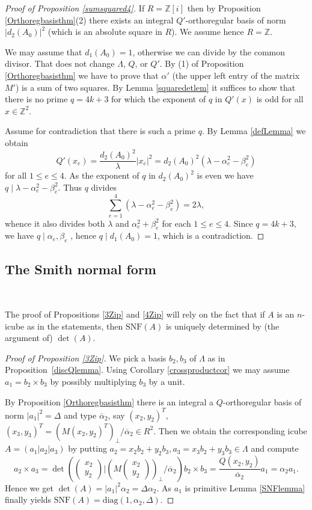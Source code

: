 \documentclass[11pt]{amsart}
\newcommand{\diag}{\mathrm{diag}}
\newcommand{\SNF}{\mathrm{SNF}}
\newcommand{\ZZ}{\mathbb{Z}}
\theoremstyle{definition}
\theoremstyle{remark}
\begin{document}
\begin{proof}[Proof of Proposition \ref{sumsquared4}]
If $R=\mathbb Z[i]$ then by Proposition \ref{Orthoregbasisthm}(2) there exists an integral $Q'$-orthoregular basis of norm $|d_2(A_0)|^2$ (which is an absolute square in $R$). We assume hence $R=\ZZ$.

We may assume that $d_1(A_0)=1$, otherwise we can divide by the common divisor. That does not change $\Lambda$, $Q$, or 
$Q'$. By (1) of Proposition \ref{Orthoregbasisthm} we have to prove that $\alpha'$ (the upper left entry of the matrix $M'$) is a sum of two squares. By Lemma \ref{squaredetlem} it suffices to show that there is no prime $q=4k+3$ for which the exponent of $q$ in $Q'(x)$ is odd for all $x\in\mathbb Z^2$.

Assume for contradiction that there is such a prime $q$. By Lemma \ref{defLemma} we obtain
\[Q'(x_e)=\frac{d_2(A_0)^2}{\lambda}|x_e|^2=d_2(A_0)^2(\lambda-\alpha_e^2-\beta_e^2)\]
for all $1\leq e\leq 4$. As the exponent of $q$ in $d_2(A_0)^2$ is even we have $q\mid\lambda-\alpha_e^2-\beta_e^2$. Thus $q$ divides
\[\sum_{e=1}^4\left(\lambda-\alpha_e^2-\beta_e^2\right)=2\lambda,\]
whence it also divides both $\lambda$ and $\alpha_e^2+\beta_e^2$ for each $1\leq e\leq 4$. Since $q=4k+3$, we have $q\mid\alpha_e,\beta_e$
, hence $q\mid d_1(A_0)=1$, which is a contradiction.
\end{proof}

\subsection{The Smith normal form}\label{SNFsection}~

The proof of Propositions \ref{3Zip} and \ref{4Zip} will rely on the fact that if $A$ is an $n$-icube as in the statements, then $\SNF(A)$ is uniquely determined by (the argument of) $\det(A)$.

\begin{proof}[Proof of Proposition \ref{3Zip}]
We pick a basis $b_2,b_3$ of $\Lambda$ as in Proposition~\ref{discQlemma}.  
Using Corollary \ref{crossproductcor} we may assume $a_1=b_2\times b_3$ by possibly multiplying $b_3$ by a unit.

By Proposition \ref{Orthoregbasisthm} there is an integral  
a $Q$-orthoregular basis of norm $|a_1|^2=\Delta$ and type $\overline\alpha_2$, say $(x_2,y_2)^T,$ $(x_3,y_3)^T=(M(x_2,y_2)^T)_\perp/\overline\alpha_2\in R^2$. Then we obtain the corresponding icube $A=(a_1|a_2|a_3)$ by putting $a_2=x_2b_2+y_2b_3,a_3=x_3b_2+y_3b_3\in\Lambda$ 
and compute
\[a_2\times a_3=\det\left(\begin{pmatrix} x_2\\ y_2\end{pmatrix}\Bigg|\left(M\begin{pmatrix} x_2\\ y_2\end{pmatrix}\right)_\perp/\overline\alpha_2\right)b_2\times b_3=\frac{Q(x_2,y_2)}{\overline\alpha_2}a_1=\alpha_2 a_1 .\]
Hence we get $\det(A)=|a_1|^2\alpha_2=\Delta\alpha_2$. As $a_1$  
is primitive Lemma \ref{SNFlemma} finally yields $\SNF(A)=\diag(1,\alpha_2,\Delta)$.
\end{proof}
\end{document}
